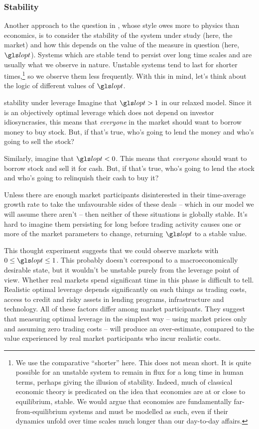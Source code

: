 \subsubsection{Stability}
Another approach to the question in , whose style owes more to physics than economics, is to consider the stability of the system under study (here, the market) and how this depends on the value of the measure in question (here, $\lopt$). Systems which are stable tend to persist over long time scales and are usually what we observe in nature. Unstable systems tend to last for shorter times,\footnote{We use the comparative ``shorter'' here. This does not mean short. It is quite possible for an unstable system to remain in flux for a long time in human terms, perhaps giving the illusion of stability. Indeed, much of classical economic theory is predicated on the idea that economies are at or close to equilibrium, \ie stable. We would argue that economies are fundamentally far-from-equilibrium systems and must be modelled as such, even if their dynamics unfold over time scales much longer than our day-to-day affairs.} so we observe them less frequently. With this in mind, let's think about the logic of different values of $\lopt$.

\begin{thoughtex}{stability under leverage}
Imagine that $\lopt>1$ in our relaxed model. Since it is an objectively optimal leverage which does not depend on investor idiosyncrasies, this means that \textit{everyone} in the market should want to borrow money to buy stock. But, if that's true, who's going to lend the money and who's going to sell the stock?

Similarly, imagine that $\lopt<0$. This means that \textit{everyone} should want to borrow stock and sell it for cash. But, if that's true, who's going to lend the stock and who's going to relinquish their cash to buy it?

Unless there are enough market participants disinterested in their time-average growth rate to take the unfavourable sides of these deals -- which in our model we will assume there aren't -- then neither of these situations is globally stable. It's hard to imagine them persisting for long before trading activity causes one or more of the market parameters to change, returning $\lopt$ to a stable value.
\end{thoughtex}

This thought experiment suggests that we could observe markets with $0\leq\lopt\leq1$. This probably doesn't correspond to a macroeconomically desirable state, but it wouldn't be unstable purely from the leverage point of view. Whether real markets spend significant time in this phase is difficult to tell. Realistic optimal leverage depends significantly on such things as trading costs, access to credit and risky assets in lending programs, infrastructure and technology. All of these factors differ among market participants. They suggest that measuring optimal leverage in the simplest way -- using market prices only and assuming zero trading costs -- will produce an over-estimate, compared to the value experienced by real market participants who incur realistic costs.


